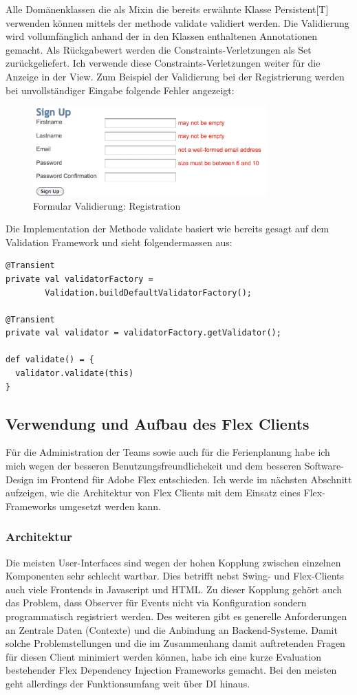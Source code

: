 Alle Dom\"anenklassen die als Mixin die bereits erw\"ahnte Klasse Persistent[T] verwenden k\"onnen mittels der methode validate validiert werden. Die Validierung wird vollumf\"anglich anhand der in den Klassen enthaltenen Annotationen gemacht. Als R\"uckgabewert werden die Constraints-Verletzungen als Set zur\"uckgeliefert. Ich verwende diese Constraints-Verletzungen weiter f\"ur die Anzeige in der View. Zum Beispiel der Validierung bei der Registrierung werden bei unvollst\"andiger Eingabe folgende Fehler angezeigt:
 \begin{figure}[H]
  	\centering
    	\includegraphics[width=9cm]{images/validation_registration}
        	\caption{Formular Validierung: Registration}
\end{figure}


Die Implementation der Methode validate basiert wie bereits gesagt auf dem Validation Framework und sieht folgendermassen aus:
\begin{lstlisting}[caption=Validation innerhalb der Klasse Persistence]
@Transient
private val validatorFactory = 
		Validation.buildDefaultValidatorFactory();

@Transient
private val validator = validatorFactory.getValidator();
  
def validate() = {
  validator.validate(this)
}
\end{lstlisting}

\subsection{Verwendung und Aufbau des Flex Clients}
F\"ur die Administration der Teams sowie auch f\"ur die Ferienplanung habe ich mich wegen der besseren Benutzungsfreundlichekeit und dem besseren Software-Design im Frontend f\"ur Adobe Flex entschieden. Ich werde im n\"achsten Abschnitt aufzeigen, wie die Architektur von Flex  Clients mit dem Einsatz eines Flex-Frameworks umgesetzt werden kann.
\subsubsection{Architektur}
Die meisten User-Interfaces sind wegen der hohen Kopplung zwischen einzelnen Komponenten sehr schlecht wartbar. Dies betrifft nebst Swing- und Flex-Clients auch viele Frontends in Javascript und HTML. Zu dieser Kopplung geh\"ort auch das Problem, dass Observer f\"ur Events nicht via Konfiguration sondern programmatisch registriert werden. Des weiteren gibt es generelle Anforderungen an Zentrale Daten (Contexte) und die Anbindung an Backend-Systeme. Damit solche Problemstellungen und die im Zusammenhang damit auftretenden Fragen f\"ur diesen Client minimiert werden k\"onnen, habe ich eine kurze Evaluation bestehender Flex Dependency Injection Frameworks gemacht. Bei den meisten geht allerdings der Funktionsumfang weit \"uber DI hinaus.

